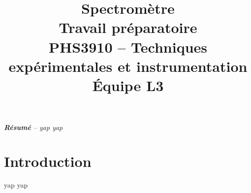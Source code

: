 \documentclass[conference]{IEEEtran}
\begin{document}
\title{Spectromètre\\
\large Travail préparatoire \\
PHS3910 -- Techniques expérimentales et instrumentation\\ 
Équipe L3}

\author{
\and
{}
\and
{}
\and
{}
}

\maketitle

\textit{\textbf{Résumé} -- yap yap}

\section{Introduction}
yap yap
\end{document}
